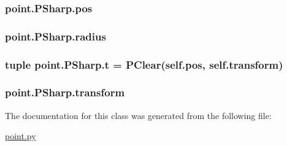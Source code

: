\subsubsection[{pos}]{\setlength{\rightskip}{0pt plus 5cm}point.\+P\+Sharp.\+pos}\label{classpoint_1_1_p_sharp_a9787083a24ff63bac9811134b2745ac1}
\hypertarget{classpoint_1_1_p_sharp_a7c2aab94ed972ccba83e761b4e2e8798}{}
\subsubsection[{radius}]{\setlength{\rightskip}{0pt plus 5cm}point.\+P\+Sharp.\+radius}\label{classpoint_1_1_p_sharp_a7c2aab94ed972ccba83e761b4e2e8798}
\hypertarget{classpoint_1_1_p_sharp_a42fca1df07d32aee57457b554d9cff1c}{}
\subsubsection[{t}]{\setlength{\rightskip}{0pt plus 5cm}tuple point.\+P\+Sharp.\+t = {\bf P\+Clear}(self.\+pos, self.\+transform)\hspace{0.3cm}{\ttfamily [static]}}\label{classpoint_1_1_p_sharp_a42fca1df07d32aee57457b554d9cff1c}
\hypertarget{classpoint_1_1_p_sharp_a0cdbf01fff6be3360181828a5e3a5dd0}{}
\subsubsection[{transform}]{\setlength{\rightskip}{0pt plus 5cm}point.\+P\+Sharp.\+transform}\label{classpoint_1_1_p_sharp_a0cdbf01fff6be3360181828a5e3a5dd0}


The documentation for this class was generated from the following file\+:\begin{DoxyCompactItemize}
\item 
\hyperlink{point_8py}{point.\+py}\end{DoxyCompactItemize}
